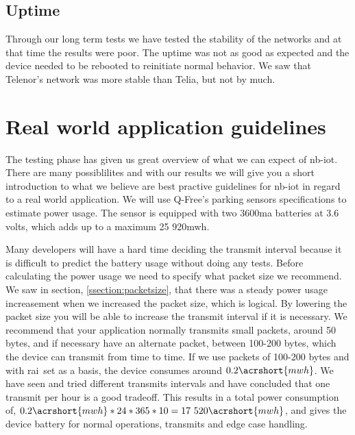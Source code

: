 \documentclass[USenglish]{ifimaster}  %
\begin{document}
\subsection{Uptime}
Through our long term tests we have tested the stability of the networks and at that time the results were poor. The uptime was not as good as expected and the device needed to be rebooted to reinitiate normal behavior. We saw that Telenor's network was more stable than Telia, but not by much.

\section{Real world application guidelines} \label{section:guidelines}
The testing phase has given us great overview of what we can expect of \acrshort{nb-iot}. There are many possiblilites and with our results we will give you a short introduction to what we believe are best practive guidelines for \acrshort{nb-iot} in regard to a real world application. We will use Q-Free's parking sensors specifications to estimate power usage. The sensor is equipped with two 3600\acrshort{ma} batteries at 3.6 volts, which adds up to a maximum 25 920\acrshort{mwh}.

Many developers will have a hard time deciding the transmit interval because it is difficult to predict the battery usage without doing any tests. Before calculating the power usage we need to specify what packet size we recommend. We saw in section, \vref{ssection:packetsize}, that there was a steady power usage increasement when we increased the packet size, which is logical. By lowering the packet size you will be able to increase the transmit interval if it is necessary. We recommend that your application normally transmits small packets, around 50 bytes, and if necessary have an alternate packet, between 100-200 bytes, which the device can transmit from time to time. If we use packets of 100-200 bytes and with \acrshort{rai} set as a basis, the device consumes around ${0.2 \acrshort{mwh}}$\cite{online:result8}. We have seen and tried different transmits intervals and have concluded that one transmit per hour is a good tradeoff. This results in a total power consumption of, ${ 0.2\acrshort{mwh} * 24 * 365 * 10 = 17 520 \acrshort{mwh}}$, and gives the device battery for normal operations, transmits and edge case handling.
\end{document}
